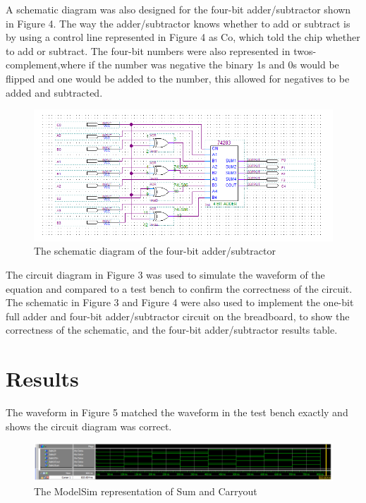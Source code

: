 \documentclass[CMPE]{KGCOEReport}
\begin{document}
A schematic diagram was also designed for the four-bit adder/subtractor shown in Figure 4. The way the adder/subtractor knows whether to add or subtract is by using a control line represented in Figure 4 as Co, which told the chip whether to add or subtract. The four-bit numbers were also represented in twos-complement,where if the number was negative the binary 1s and 0s would be flipped and one would be added to the number, this allowed for negatives to be added and subtracted.

\begin{figure}[H]
	\centering
	\includegraphics[width=1.0\textwidth]{QuartusL6PT2}
	\caption{The schematic diagram of the four-bit adder/subtractor}
	\label{fig: Figure 4}
\end{figure} 

The circuit diagram in Figure 3 was used to simulate the waveform of the equation and compared to a test bench to confirm the correctness of the circuit. The schematic in Figure 3  and Figure 4 were also used to implement the one-bit full adder and four-bit adder/subtractor circuit on the breadboard, to show the correctness of the schematic, and the four-bit adder/subtractor results table.

\section*{Results}

The waveform in Figure 5 matched the waveform in the test bench exactly and shows the circuit diagram was correct. 

\begin{figure}[H]
	\flushleft
	\includegraphics[width=1.0\textwidth]{ModelSimL6}
	\caption{The ModelSim representation of Sum and Carryout}
	\label{fig: Figure 5}
\end{figure}
\end{document}
